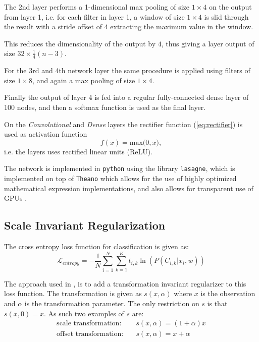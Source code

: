 The 2nd layer performs a 1-dimensional max pooling of size $1 \times 4$ on the output from layer 1, i.e. for each filter in layer 1, a window of size $1 \times 4$ is slid through the result with a stride offset of $4$ extracting the maximum value in the window.

This reduces the dimensionality of the output by $4$, thus giving a layer output of size $32 \times \frac{1}{4}(n-3)$.

For the 3rd and 4th network layer the same procedure is applied using filters of size $1 \times 8$, and again a max pooling of size $1 \times 4$.

Finally the output of layer 4 is fed into a regular fully-connected dense layer of $100$ nodes, and then a softmax function is used as the final layer.

On the \emph{Convolutional} and \emph{Dense} layers the rectifier function (\cref{eq:rectifier}) is used as activation function
\begin{equation}
  f(x) = \text{max(}0, x\text{)},
  \label{eq:rectifier}
\end{equation}
i.e. the layers uses rectified linear units (ReLU).

The network is implemented in \texttt{python} using the library \texttt{lasagne}, which is implemented on top of \texttt{Theano} which allows for the use of highly optimized mathematical expression implementations, and also allows for transparent use of GPUs \cite{theano}.

\subsection{Scale Invariant Regularization}

The cross entropy loss function for classification is given as:
\begin{equation}
\mathcal{L}_{entropy} = - \frac{1}{N} \sum_{i=1}^N \sum_{k=1}^K t_{i,k} \ln(P(C_{i,k} | x_i, w))
\end{equation}

The approach used in \cite{scale-invariante}, is to add a transformation invariant regularizer to this loss function. The transformation is given as $s(x, \alpha)$ where $x$ is the observation and $\alpha$ is the transformation parameter. The only restriction on $s$ is that $s(x, 0) = x$. As such two examples of $s$ are:
\begin{align}
\text{scale transformation:}&\quad s(x, \alpha) = (1+\alpha) x\\
\text{offset transformation:}&\quad s(x, \alpha) = x + \alpha
\end{align}

